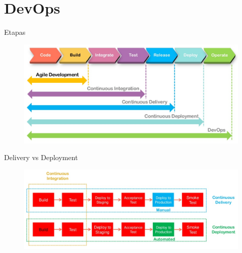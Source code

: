 \documentclass[aspectratio=169]{beamer}
\begin{document}
{
    \section{DevOps}
}

\begin{frame}{Etapas}
\begin{figure}
	\centering
	\includegraphics[width=\linewidth]{Images/etapa1}
	\label{fig:etapa1}
\end{figure}
\end{frame}

\begin{frame}{Delivery vs Deployment}
\begin{figure}
	\centering
	\includegraphics[width=\linewidth]{Images/etapa2}
	\label{fig:etapa2}
\end{figure}
\end{frame}
\end{document}
